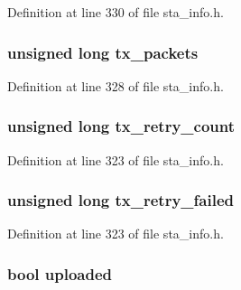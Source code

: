 Definition at line 330 of file sta\-\_\-info.\-h.

\hypertarget{structsta__info_a04c4bb1c42d342d7b70a79c91a7ab2b7}{
\subsubsection[{tx\-\_\-packets}]{\setlength{\rightskip}{0pt plus 5cm}unsigned long tx\-\_\-packets}}\label{structsta__info_a04c4bb1c42d342d7b70a79c91a7ab2b7}


Definition at line 328 of file sta\-\_\-info.\-h.

\hypertarget{structsta__info_ac0325bffa5a0874c0f3f62ec77ddbadf}{
\subsubsection[{tx\-\_\-retry\-\_\-count}]{\setlength{\rightskip}{0pt plus 5cm}unsigned long tx\-\_\-retry\-\_\-count}}\label{structsta__info_ac0325bffa5a0874c0f3f62ec77ddbadf}


Definition at line 323 of file sta\-\_\-info.\-h.

\hypertarget{structsta__info_af0a03540f21240022f46246dd3fd1136}{
\subsubsection[{tx\-\_\-retry\-\_\-failed}]{\setlength{\rightskip}{0pt plus 5cm}unsigned long tx\-\_\-retry\-\_\-failed}}\label{structsta__info_af0a03540f21240022f46246dd3fd1136}


Definition at line 323 of file sta\-\_\-info.\-h.

\hypertarget{structsta__info_a5a978acf843365688119db95ca4ba0b1}{
\subsubsection[{uploaded}]{\setlength{\rightskip}{0pt plus 5cm}bool uploaded}}\label{structsta__info_a5a978acf843365688119db95ca4ba0b1}


